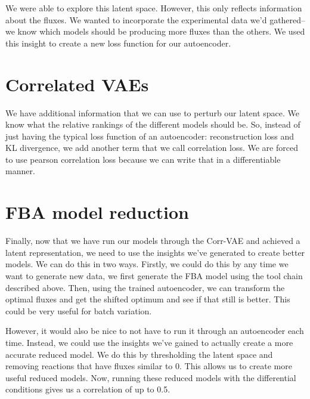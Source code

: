 We were able to explore this latent space.
However, this only reflects information about the fluxes.
We wanted to incorporate the experimental data we'd gathered--we know which models should be producing more fluxes than the others.
We used this insight to create a new loss function for our autoencoder.

\section{Correlated VAEs}
We have additional information that we can use to perturb our latent space.
We know what the relative rankings of the different models should be.
So, instead of just having the typical loss function of an autoencoder: reconstruction loss and KL divergence, we add another term that we call correlation loss.
We are forced to use pearson correlation loss because we can write that in a differentiable manner.

\section{FBA model reduction}
Finally, now that we have run our models through the Corr-VAE and achieved a latent representation, we need to use the insights we've generated to create better models.
We can do this in two ways.
Firstly, we could do this by any time we want to generate new data, we first generate the FBA model using the tool chain described above.
Then, using the trained autoencoder, we can transform the optimal fluxes and get the shifted optimum and see if that still is better.
This could be very useful for batch variation.

However, it would also be nice to not have to run it through an autoencoder each time.
Instead, we could use the insights we've gained to actually create a more accurate reduced model.
We do this by thresholding the latent space and removing reactions that have fluxes similar to 0.
This allows us to create more useful reduced models.
Now, running these reduced models with the differential conditions gives us a correlation of up to 0.5.

\cite{ebrahim2013cobrapy}